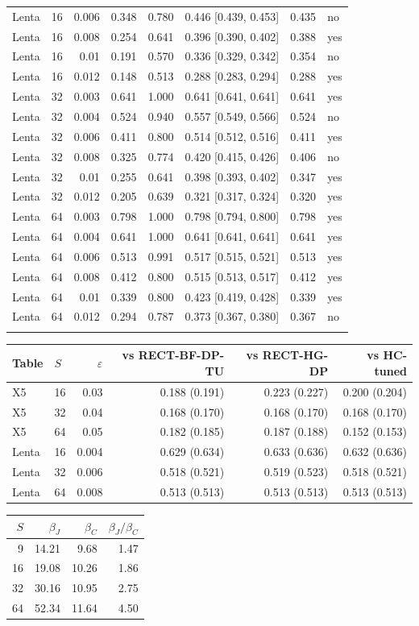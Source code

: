\begin{tabular}{llrrrrrl}
Lenta & 16 & 0.006 & 0.348 & 0.780 & 0.446 [0.439, 0.453] & 0.435 & no \\
Lenta & 16 & 0.008 & 0.254 & 0.641 & 0.396 [0.390, 0.402] & 0.388 & yes \\
Lenta & 16 & 0.01 & 0.191 & 0.570 & 0.336 [0.329, 0.342] & 0.354 & no \\
Lenta & 16 & 0.012 & 0.148 & 0.513 & 0.288 [0.283, 0.294] & 0.288 & yes \\
\addlinespace
Lenta & 32 & 0.003 & 0.641 & 1.000 & 0.641 [0.641, 0.641] & 0.641 & yes \\
Lenta & 32 & 0.004 & 0.524 & 0.940 & 0.557 [0.549, 0.566] & 0.524 & no \\
Lenta & 32 & 0.006 & 0.411 & 0.800 & 0.514 [0.512, 0.516] & 0.411 & yes \\
Lenta & 32 & 0.008 & 0.325 & 0.774 & 0.420 [0.415, 0.426] & 0.406 & no \\
Lenta & 32 & 0.01 & 0.255 & 0.641 & 0.398 [0.393, 0.402] & 0.347 & yes \\
Lenta & 32 & 0.012 & 0.205 & 0.639 & 0.321 [0.317, 0.324] & 0.320 & yes \\
\addlinespace
Lenta & 64 & 0.003 & 0.798 & 1.000 & 0.798 [0.794, 0.800] & 0.798 & yes \\
Lenta & 64 & 0.004 & 0.641 & 1.000 & 0.641 [0.641, 0.641] & 0.641 & yes \\
Lenta & 64 & 0.006 & 0.513 & 0.991 & 0.517 [0.515, 0.521] & 0.513 & yes \\
Lenta & 64 & 0.008 & 0.412 & 0.800 & 0.515 [0.513, 0.517] & 0.412 & yes \\
Lenta & 64 & 0.01 & 0.339 & 0.800 & 0.423 [0.419, 0.428] & 0.339 & yes \\
Lenta & 64 & 0.012 & 0.294 & 0.787 & 0.373 [0.367, 0.380] & 0.367 & no \\
\addlinespace
\bottomrule
\end{tabular}

\begin{tabular}{llrrrr}
\toprule
Table & $S$ & $\varepsilon$ & vs RECT-BF-DP-TU & vs RECT-HG-DP & vs HC-tuned \\
\midrule
X5 & 16 & 0.03 & 0.188 (0.191) & 0.223 (0.227) & 0.200 (0.204) \\
X5 & 32 & 0.04 & 0.168 (0.170) & 0.168 (0.170) & 0.168 (0.170) \\
X5 & 64 & 0.05 & 0.182 (0.185) & 0.187 (0.188) & 0.152 (0.153) \\
Lenta & 16 & 0.004 & 0.629 (0.634) & 0.633 (0.636) & 0.632 (0.636) \\
Lenta & 32 & 0.006 & 0.518 (0.521) & 0.519 (0.523) & 0.518 (0.521) \\
Lenta & 64 & 0.008 & 0.513 (0.513) & 0.513 (0.513) & 0.513 (0.513) \\
\bottomrule
\end{tabular}

\begin{tabular}{rrrr}
\toprule
$S$ & $\beta_J$ & $\beta_C$ & $\beta_J/\beta_C$ \\
\midrule
9 & 14.21 & 9.68 & 1.47 \\
16 & 19.08 & 10.26 & 1.86 \\
32 & 30.16 & 10.95 & 2.75 \\
64 & 52.34 & 11.64 & 4.50 \\
\bottomrule
\end{tabular}
